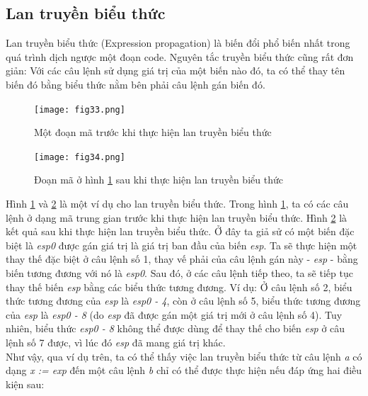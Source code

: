 \subsection{Lan truyền biểu thức}
Lan truyền biểu thức (Expression propagation) \cite{exprop} là biến đổi phổ biến nhất trong quá trình dịch ngược một đoạn code. Nguyên tắc truyền biểu thức cũng rất đơn giản: Với các câu lệnh sử dụng giá trị của một biến nào đó, ta có thể thay tên biến đó bằng biểu thức nằm bên phải câu lệnh gán biến đó.\\
\begin{figure}[h]
	\centering
	\texttt{[image: fig33.png]}
	\caption{Một đoạn mã trước khi thực hiện lan truyền biểu thức}
	\label{fig:33}
\end{figure}
\begin{figure}[h]
	\centering
	\texttt{[image: fig34.png]}
	\caption{Đoạn mã ở hình \ref{fig:33} sau khi thực hiện lan truyền biểu thức}
	\label{fig:34}
\end{figure}
Hình \ref{fig:33} và \ref{fig:34} là một ví dụ cho lan truyền biểu thức. Trong hình \ref{fig:33}, ta có các câu lệnh ở dạng mã trung gian trước khi thực hiện lan truyền biểu thức. Hình \ref{fig:34} là kết quả sau khi thực hiện lan truyền biểu thức. Ở đây ta giả sử có một biến đặc biệt là \textit{esp0} được gán giá trị là giá trị ban đầu của biến \textit{esp}. Ta sẽ thực hiện một thay thế đặc biệt ở câu lệnh số 1, thay vế phải của câu lệnh gán này - \textit{esp} - bằng biến tương đương với nó là \textit{esp0}. Sau đó, ở các câu lệnh tiếp theo, ta sẽ tiếp tục thay thế biến \textit{esp} bằng các biểu thức tương đương. Ví dụ: Ở câu lệnh số 2, biểu thức tương đương của \textit{esp} là \textit{esp0 - 4}, còn ở câu lệnh số 5, biểu thức tương đương của \textit{esp} là \textit{esp0 - 8} (do \textit{esp} đã được gán một giá trị mới ở câu lệnh số 4). Tuy nhiên, biểu thức \textit{esp0 - 8} không thể được dùng để thay thế cho biến \textit{esp} ở câu lệnh số 7 được, vì lúc đó \textit{esp} đã mang giá trị khác.\\

Như vậy, qua ví dụ trên, ta có thể thấy việc lan truyền biểu thức từ câu lệnh \textit{a} có dạng \textit{x := exp} đến một câu lệnh \textit{b} chỉ có thể được thực hiện nếu đáp ứng hai điều kiện sau:


